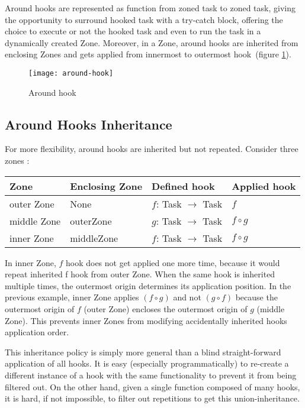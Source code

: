 Around hooks are represented as function from zoned task to zoned task, giving the opportunity to surround hooked task with a try-catch block, offering the choice  to execute or not the hooked task and even to run the task in a dynamically created Zone. Moreover, in a Zone, around hooks are inherited from enclosing Zones and gets applied from innermost to outermost hook~(figure \ref{fig:around-hook}).

\begin{figure}[h]
  \centering
  \texttt{[image: around-hook]}
  \caption{Around hook}
  \label{fig:around-hook}
\end{figure}

\subsection*{Around Hooks Inheritance}

For more flexibility, around hooks are inherited but not repeated. Consider three zones :

\begin{tabular}{|l|l|l|l|}
\hline
\textbf{Zone} & \textbf{Enclosing Zone} & \textbf{Defined hook} & \textbf{Applied hook}
\\\hline
outer Zone & None & $f$: Task $\rightarrow$ Task & $f$
\\\hline
middle Zone & outerZone & $g$: Task $\rightarrow$ Task & $f \circ g$
\\\hline
inner Zone & middleZone & $f$: Task $\rightarrow$ Task & $f \circ g$
\\\hline
\end{tabular}

In inner Zone, $f$ hook does not get applied one more time, because it would repeat inherited f hook from outer Zone. When the same hook is inherited multiple times, the outermost origin determines its application position. In the previous example, inner Zone applies $( f \circ g )$ and not $( g \circ f )$ because the outermost origin of $f$ (outer Zone) encloses the outermost origin of $g$ (middle Zone). This prevents inner Zones from modifying accidentally inherited hooks application order.

This inheritance policy is simply more general than a blind straight-forward application of all hooks. It is easy (especially programmatically) to re-create a different instance of a hook with the same functionality to prevent it from being filtered out. On the other hand, given a single function composed of many hooks, it is hard, if not impossible, to filter out repetitions to get this union-inheritance.

